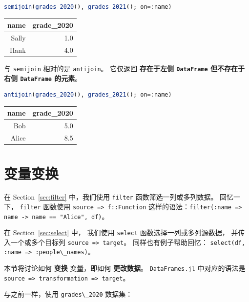 \documentclass[
  notoc %
]{tufte-book}
\newcommand{\passthrough}[1]{#1}
\begin{document}
\begin{lstlisting}[language=Julia]
semijoin(grades_2020(), grades_2021(); on=:name)
\end{lstlisting}

\begin{longtable}[]{@{}rr@{}}
\toprule
name & grade\_2020 \\
\midrule
\endhead
Sally & 1.0 \\
Hank & 4.0 \\
\bottomrule
\end{longtable}

与 \passthrough{\lstinline!semijoin!} 相对的是
\passthrough{\lstinline!antijoin!}。 它仅返回 \textbf{存在于左侧
\passthrough{\lstinline!DataFrame!} 但不存在于右侧
\passthrough{\lstinline!DataFrame!} 的元素}。

\begin{lstlisting}[language=Julia]
antijoin(grades_2020(), grades_2021(); on=:name)
\end{lstlisting}

\begin{longtable}[]{@{}rr@{}}
\toprule
name & grade\_2020 \\
\midrule
\endhead
Bob & 5.0 \\
Alice & 8.5 \\
\bottomrule
\end{longtable}

\hypertarget{sec:df_transform}{%
\section{变量变换}\label{sec:df_transform}}

在 Section~\ref{sec:filter} 中，我们使用
\passthrough{\lstinline!filter!} 函数筛选一列或多列数据。 回忆一下，
\passthrough{\lstinline!filter!} 函数使用
\passthrough{\lstinline!source => f::Function!}
这样的语法：\passthrough{\lstinline!filter(:name => name -> name == "Alice", df)!}。

在 Section~\ref{sec:select} 中， 我们使用
\passthrough{\lstinline!select!} 函数选择一列或多列源数据，
并传入一个或多个目标列 \passthrough{\lstinline!source => target!}。
同样也有例子帮助回忆：
\passthrough{\lstinline!select(df, :name => :people\_names)!}。

本节将讨论如何 \textbf{变换} 变量，即如何 \textbf{更改数据}。
\passthrough{\lstinline!DataFrames.jl!} 中对应的语法是
\passthrough{\lstinline!source => transformation => target!}。

与之前一样，使用 \passthrough{\lstinline!grades\_2020!} 数据集：
\end{document}

